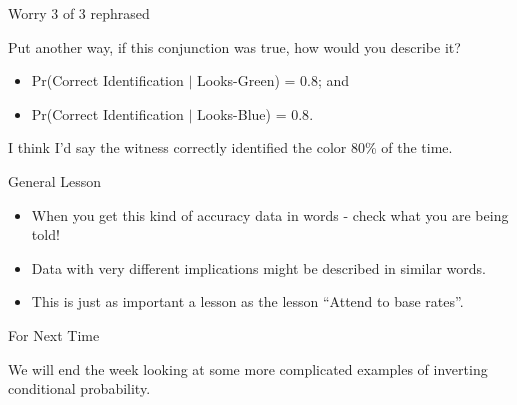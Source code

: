\documentclass[
  ignorenonframetext,
]{beamer}
\providecommand{\tightlist}{%
  \setlength{\itemsep}{0pt}\setlength{\parskip}{0pt}}
\renewcommand{\,}{\text{, }}
\begin{document}
\begin{frame}{Worry 3 of 3 rephrased}
\protect\hypertarget{worry-3-of-3-rephrased}{}

Put another way, if this conjunction was true, how would you describe
it?

\begin{itemize}
\tightlist
\item
  Pr(Correct Identification \(|\) Looks-Green) = \(0.8\); and
\item
  Pr(Correct Identification \(|\) Looks-Blue) = \(0.8\). \pause
\end{itemize}

I think I'd say the witness correctly identified the color 80\% of the
time.

\end{frame}

\begin{frame}{General Lesson}
\protect\hypertarget{general-lesson}{}

\begin{itemize}
\tightlist
\item
  When you get this kind of accuracy data in words - check what you are
  being told!
\item
  Data with very different implications might be described in similar
  words.
\item
  This is just as important a lesson as the lesson ``Attend to base
  rates''.
\end{itemize}

\end{frame}

\begin{frame}{For Next Time}
\protect\hypertarget{for-next-time}{}

We will end the week looking at some more complicated examples of
inverting conditional probability.

\end{frame}
\end{document}
